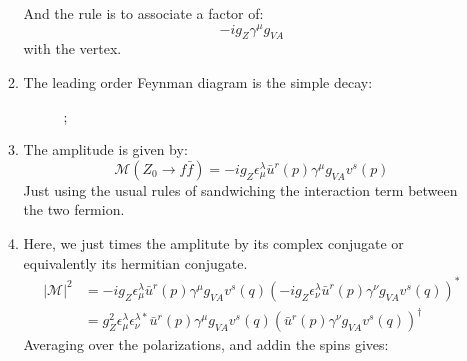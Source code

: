 \documentclass[12pt,a4]{article}
\begin{document}
\begin{enumerate}
\begin{enumerate}
        And the rule is to associate a factor of:
        \begin{equation*}
          - i g_Z \gamma^\mu g_{V A}
        \end{equation*}
        with the vertex.
      \item
        The leading order Feynman diagram is the simple decay:
        \begin{figure}[!ht]
          \centering
          ;
        \end{figure}
      \item
        The amplitude is given by:
        \begin{equation*}
          \mathcal{M}(Z_0 \to f \bar{f}) = - i g_Z \epsilon_\mu^\lambda \bar{u}^r(p) \gamma^\mu g_{V A} v^s(p)
        \end{equation*}
        Just using the usual rules of sandwiching the interaction term between the two fermion.
      \item
        Here, we just times the amplitute by its complex conjugate or equivalently its hermitian conjugate.
        \begin{align*}
          |\mathcal{M}|^2 &= - i g_Z \epsilon_\mu^\lambda \bar{u}^r(p) \gamma^\mu g_{V A} v^s(q) (- i g_Z \epsilon_\nu^\lambda \bar{u}^r(p) \gamma^\nu g_{V A} v^s(q))^*\\
                                   &= g_Z^2 \epsilon_\mu^\lambda \epsilon_\nu^{\lambda *} \bar{u}^r(p) \gamma^\mu g_{V A} v^s(q) ( \bar{u}^r(p) \gamma^\nu g_{V A} v^s(q))^\dagger
        \end{align*}
        Averaging over the polarizations, and addin the spins gives:
        \begin{align*}

\end{align*}
\end{enumerate}
\end{enumerate}
\end{document}

